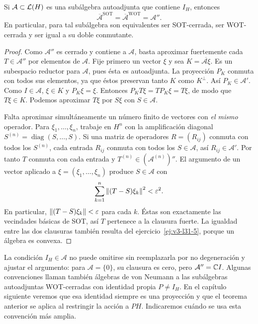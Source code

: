 \begin{teorema}\label{v3:doble-conmutante}
Si $\mathcal A\subset\mathcal L(H)$ es una subálgebra autoadjunta que contiene $I_H$, entonces
\[
 \overline{\mathcal A}^{\mathrm{SOT}}
 =\overline{\mathcal A}^{\mathrm{WOT}}=\mathcal A''.
\]
En particular, para tal subálgebra son equivalentes ser SOT-cerrada, ser WOT-cerrada y ser igual a su doble conmutante.
\end{teorema}
\begin{proof}
Como $\mathcal A''$ es cerrado y contiene a $\mathcal A$, basta aproximar fuertemente cada $T\in\mathcal A''$ por elementos de $\mathcal A$. Fije primero un vector $\xi$ y sea $K=\overline{\mathcal A\xi}$. Es un subespacio reductor para $\mathcal A$, pues ésta es autoadjunta. La proyección $P_K$ conmuta con todos sus elementos, ya que éstos preservan tanto $K$ como $K^\perp$. Así $P_K\in\mathcal A'$. Como $I\in\mathcal A$, $\xi\in K$ y $P_K\xi=\xi$. Entonces $P_KT\xi=TP_K\xi=T\xi$, de modo que $T\xi\in K$. Podemos aproximar $T\xi$ por $S\xi$ con $S\in\mathcal A$.

Falta aproximar simultáneamente un número finito de vectores con \emph{el mismo} operador. Para $\xi_1,\ldots,\xi_n$, trabaje en $H^n$ con la amplificación diagonal $S^{(n)}=\operatorname{diag}(S,\ldots,S)$. Si una matriz de operadores $R=(R_{ij})$ conmuta con todos los $S^{(n)}$, cada entrada $R_{ij}$ conmuta con todos los $S\in\mathcal A$, así $R_{ij}\in\mathcal A'$. Por tanto $T$ conmuta con cada entrada y $T^{(n)}\in(\mathcal A^{(n)})''$. El argumento de un vector aplicado a $\xi=(\xi_1,\ldots,\xi_n)$ produce $S\in\mathcal A$ con
\[
 \sum_{k=1}^n\left\lVert(T-S)\xi_k\right\rVert^2<\varepsilon^2.
\]
En particular, $\left\lVert(T-S)\xi_k\right\rVert<\varepsilon$ para cada $k$. Éstas son exactamente las vecindades básicas de SOT, así $T$ pertenece a la clausura fuerte. La igualdad entre las dos clausuras también resulta del ejercicio~\ref{ej:v3-l31-5}, porque un álgebra es convexa.
\end{proof}

La condición $I_H\in\mathcal A$ no puede omitirse sin reemplazarla por no degeneración y ajustar el argumento: para $\mathcal A=\{0\}$, su clausura es cero, pero $\mathcal A''=\mathbb C I$. Algunas convenciones llaman también álgebras de von Neumann a las subálgebras autoadjuntas WOT-cerradas con identidad propia $P\ne I_H$. En el capítulo siguiente veremos que esa identidad siempre es una proyección y que el teorema anterior se aplica al restringir la acción a $PH$. Indicaremos cuándo se usa esta convención más amplia.

